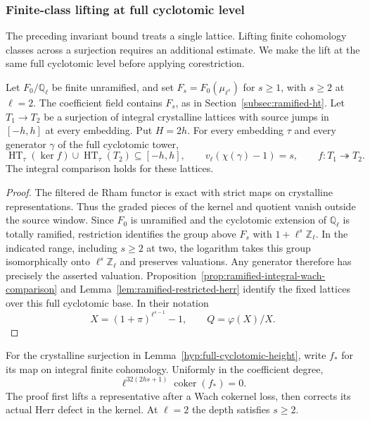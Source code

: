 \subsubsection*{Finite-class lifting at full cyclotomic level}
\label{subsec:ramified-lift}

The preceding invariant bound treats a single lattice. Lifting finite cohomology classes across a surjection requires an additional estimate. We make the lift at the same full cyclotomic level before applying corestriction.

\begin{established}\label{hyp:full-cyclotomic-height}
Let \(F_0/\mathbb Q_\ell\) be finite unramified, and set
\(F_s=F_0(\mu_{\ell^s})\) for \(s\ge1\), with \(s\ge2\)
at \(\ell=2\). The coefficient field contains \(F_s\),
as in Section~\ref{subsec:ramified-ht}. Let \(T_1\to T_2\)
be a surjection of integral crystalline lattices with
source jumps in \([-h,h]\) at every embedding. Put
\(H=2h\). For every embedding \(\tau\) and every generator \(\gamma\) of the full cyclotomic tower,
\[
 \operatorname{HT}_\tau(\ker f)\cup\operatorname{HT}_\tau(T_2)
 \subseteq[-h,h],\qquad v_\ell(\chi(\gamma)-1)=s,
 \qquad f:T_1\twoheadrightarrow T_2 .
\]
The integral comparison holds for these lattices.
\end{established}
\begin{proof}
The filtered de Rham functor is exact with strict maps on crystalline representations. Thus the graded pieces of the kernel and quotient vanish outside the source window. Since \(F_0\) is unramified and the cyclotomic extension of \(\mathbb Q_\ell\) is totally ramified, restriction identifies the group above \(F_s\) with \(1+\ell^s\mathbb Z_\ell\). In the indicated range, including \(s\ge2\) at two, the logarithm takes this group isomorphically onto \(\ell^s\mathbb Z_\ell\) and preserves valuations. Any generator therefore has precisely the asserted valuation. Proposition~\ref{prop:ramified-integral-wach-comparison} and Lemma~\ref{lem:ramified-restricted-herr} identify the fixed lattices over this full cyclotomic base. In their notation
\[
 X=(1+\pi)^{\ell^{s-1}}-1,\qquad Q=\varphi(X)/X .
\]
\label{cor:full-cyclotomic-lifting-1}
\end{proof}

\begin{proposition}\label{prop:full-cyclotomic-finite-lift}
For the crystalline surjection in Lemma~\ref{hyp:full-cyclotomic-height}, write \(f_*\) for its map on integral finite cohomology. Uniformly in the coefficient degree,
\[
 \ell^{32(2hs+1)}\operatorname{coker}(f_*)=0.
\]
The proof first lifts a representative after a Wach cokernel
loss, then corrects its actual Herr defect in the kernel.
At \(\ell=2\) the depth satisfies \(s\ge2\).
\end{proposition}

